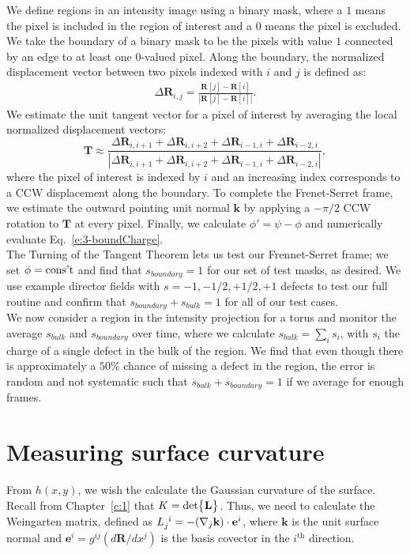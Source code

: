 We define regions in an intensity image using a binary mask, where a $1$ means the pixel is included in the region of interest and a $0$ means the pixel is excluded.
We take the boundary of a binary mask to be the pixels with value $1$ connected by an edge to at least one $0$-valued pixel.
Along the boundary, the normalized displacement vector between two pixels indexed with $i$ and $j$ is defined as:
\begin{align}
  \Delta \mathbf{R}_{i,j} =  \frac{\mathbf{R}[j]-\mathbf{R}[i]}{|\mathbf{R}[j]-\mathbf{R}[i]|}.
\end{align}
We estimate the unit tangent vector for a pixel of interest by averaging the local normalized displacement vectors:
\begin{equation}
  \mathbf{T} \approx \frac{\Delta \mathbf{R}_{i,i+1} + \Delta \mathbf{R}_{i,i+2} + \Delta \mathbf{R}_{i-1,i} + \Delta \mathbf{R}_{i-2,i}}{|\Delta \mathbf{R}_{i,i+1} + \Delta \mathbf{R}_{i,i+2} + \Delta \mathbf{R}_{i-1,i} + \Delta \mathbf{R}_{i-2,i}|},
\end{equation}
where the pixel of interest is indexed by $i$ and an increasing index corresponds to a CCW displacement along the boundary.
To complete the Frenet-Serret frame, we estimate the outward pointing unit normal $\mathbf{k}$ by applying a $-\pi/2$ CCW rotation to $\mathbf{T}$ at every pixel.
Finally, we calculate $\phi' = \psi-\phi$ and numerically evaluate Eq.~\ref{e:3-boundCharge}.\\

The Turning of the Tangent Theorem lets us test our Frennet-Serret frame; we set $\phi = \textup{cons't}$ and find that $s_{boundary} = 1$ for our set of test masks, as desired.
We use example director fields with $s = -1, -1/2, +1/2, +1$ defects to test our full routine and confirm that $s_{boundary} + s_{bulk} = 1$ for all of our test cases.\\


We now consider a region in the intensity projection for a torus and monitor the average $s_{bulk}$ and $s_{boundary}$ over time, where we calculate $s_{bulk} = \sum\limits_i s_i$, with $s_i$ the charge of a single defect in the bulk of the region.
We find that even though there is approximately a $50\%$ chance of missing a defect in the region, the error is random and not systematic such that $\overbar{s}_{bulk} + \overbar{s}_{boundary} = 1$ if we average for enough frames.





\section{Measuring surface curvature}
From $h(x,y)$, we wish the calculate the Gaussian curvature of the surface.
Recall from Chapter~\ref{c:1} that $K = \textup{det} \big \{ \mathbf{L} \big \}$.
Thus, we need to calculate the Weingarten matrix, defined as $\tensor{L}{_j^i} = -(\nabla_j \mathbf{k}) \cdot \mathbf{e}^i$, where $\mathbf{k}$ is the unit surface normal and $\mathbf{e}^i = g^{ij}(d \mathbf{R}/dx^j)$ is the basis covector in the $i^{\textrm{th}}$ direction.


